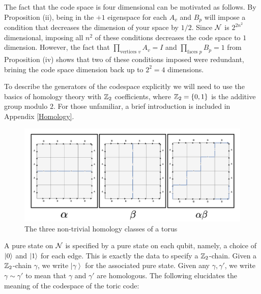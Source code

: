 \documentclass{article}
\theoremstyle{definition}
\numberwithin{figure}{section}
\begin{document}
The fact that the code space is four dimensional can be motivated as follows. By Proposition \label{AvBp} (ii), being in the $+1$ eigenspace for each $A_v$ and $B_p$ will impose a condition that decreases the dimension of your space by $1/2$. Since $\mathcal{N}$ is $2^{2n^2}$ dimensional, imposing all $n^2$ of these conditions decreases the code space to $1$ dimension. However, the fact that $\prod_{\text{vertices }v}A_v=I$ and $\prod_{\text{faces }p}B_p=1$  from Proposition \label{AvBp} (iv) shows that two of these conditions imposed were redundant, brining the code space dimension back up to $2^2=4$ dimensions.

To describe the generators of the codespace explicitly we will need to use the basics of homology theory with $\mathbb{Z}_2$ coefficients, where $\mathbb{Z}_2=\{0,1\}$ is the additive group modulo $2$. For those unfamiliar, a brief introduction is included in Appendix \ref{Homology}.

\begin{figure}
\begin{center}
\includegraphics[scale=0.35]{homology-classes}
\caption{The three non-trivial homology classes of a torus}
\label{fig:homology}
\end{center}
\end{figure}


A pure state on $\mathcal{N}$ is specified by a pure state on each qubit, namely, a choice of $\left|0\right>$ and $\left|1\right>$ for each edge. This is exactly the data to specify a $\mathbb{Z}_2$-chain. Given a $\mathbb{Z}_2$-chain $\gamma$, we write $\left|\gamma\right>$ for the associated pure state. Given any $\gamma,\gamma'$, we write $\gamma\sim \gamma'$ to mean that $\gamma$ and $\gamma'$ are homologous. The following elucidates the meaning of the codespace of the toric code:
\end{document}
